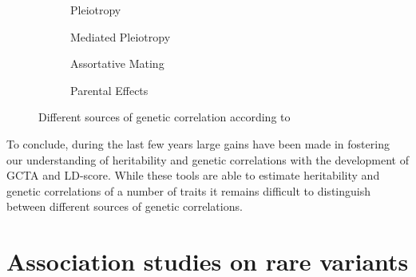 \begin{figure}[htp]
  \begin{subfigure}[t]{0.4\textwidth}
    \centering
    \resizebox{0.5\linewidth}{!}{} 
    \caption{Pleiotropy}\label{fig:pleiotropy}
  \end{subfigure}
  \begin{subfigure}[t]{0.4\textwidth}
    \centering
    \resizebox{0.5\linewidth}{!}{} 
    \caption{Mediated Pleiotropy}\label{fig:mediated_pleiotropy}
  \end{subfigure}
  \begin{subfigure}[t]{0.4\textwidth}
    \centering
    \resizebox{0.6\linewidth}{!}{} 
    \caption{Assortative Mating}\label{fig:assortative_mating}
  \end{subfigure}
  \begin{subfigure}[t]{0.4\textwidth}
    \centering
    \resizebox{0.6\linewidth}{!}{}
    \caption{Parental Effects}\label{fig:parental_effects}
  \end{subfigure}
  \caption[Sources of genetic correlations]{Different sources of genetic correlation according to~\citet{Pickrell2016}}\label{fig:genetic_correlation}
\end{figure}

To conclude, during the last few years large gains have been made in fostering our understanding of heritability and genetic correlations with the development of GCTA and LD-score.
While these tools are able to estimate heritability and genetic correlations of a number of traits it remains difficult to distinguish between different sources of genetic correlations.

\section{Association studies on rare variants}
\label{sec:association_studies_on_rare_varitants}


